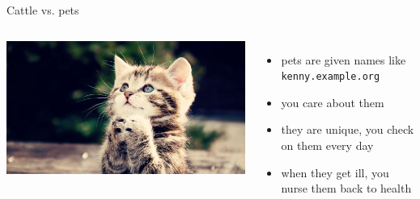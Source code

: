 \documentclass[english,serif,mathserif,usenames,dvipsnames]{beamer}
\begin{document}
\begin{frame}[fragile]
  {Cattle vs. pets}

  \scriptsize
  \begin{columns}
    \includegraphics[width=\linewidth]{kitten}
      \begin{itemize}
      \item pets are given names like \texttt{kenny.example.org}
      \item you care about them
      \item they are unique, you check on them every day
      \item when they get ill, you nurse them back to health
      \end{itemize}

  \end{columns}
  \+\+\+
  \begin{columns}

  \end{columns}

\end{frame}
\end{document}
